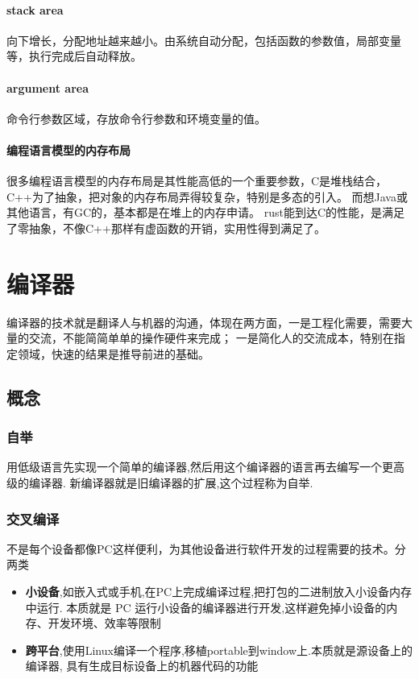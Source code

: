 \subsubsection{stack area}
向下增长，分配地址越来越小。由系统自动分配，包括函数的参数值，局部变量等，执行完成后自动释放。

\subsubsection{argument area}
命令行参数区域，存放命令行参数和环境变量的值。

\subsubsection{编程语言模型的内存布局}
很多编程语言模型的内存布局是其性能高低的一个重要参数，C是堆栈结合，C++为了抽象，把对象的内存布局弄得较复杂，特别是多态的引入。
而想Java或其他语言，有GC的，基本都是在堆上的内存申请。
rust能到达C的性能，是满足了零抽象，不像C++那样有虚函数的开销，实用性得到满足了。

\chapter{编译器}
编译器的技术就是翻译人与机器的沟通，体现在两方面，一是工程化需要，需要大量的交流，不能简简单单的操作硬件来完成；
一是简化人的交流成本，特别在指定领域，快速的结果是推导前进的基础。

\section{概念}

\subsection{自举}
用低级语言先实现一个简单的编译器,然后用这个编译器的语言再去编写一个更高级的编译器.
新编译器就是旧编译器的扩展,这个过程称为自举.

\subsection{交叉编译}
不是每个设备都像PC这样便利，为其他设备进行软件开发的过程需要的技术。分两类
\begin{itemize}
    \item {\textbf{小设备},如嵌入式或手机,在PC上完成编译过程,把打包的二进制放入小设备内存中运行.
    本质就是 PC 运行小设备的编译器进行开发,这样避免掉小设备的内存、开发环境、效率等限制}
    \item {\textbf{跨平台},使用Linux编译一个程序,移植portable到window上.本质就是源设备上的编译器,
    具有生成目标设备上的机器代码的功能}
\end{itemize}

